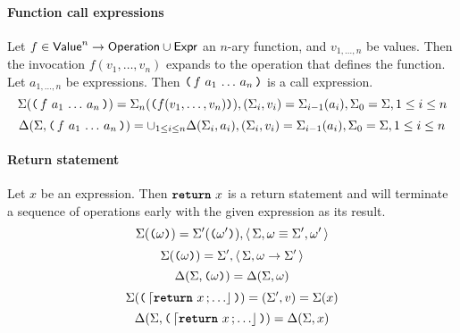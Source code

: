 \paragraph{Function call expressions}
Let $f \in \mathsf{Value}^n \to \mathsf{Operation} \cup \mathsf{Expr}$ an $n$-ary function, and $v_{1, \ldots, n}$ be values.
Then the invocation $f(v_1, \ldots, v_n)$ expands to the operation that defines the function.
Let $a_{1, \ldots, n}$ be expressions.
Then $\opexp{f}{a_1}{\ldots}{a_n}$ is a call expression.
$$
\Sigma(\opexp{f}{a_1}{\ldots}{a_n}) = \Sigma_n(\ttlparen f(v_1, \ldots, v_n) \ttrparen),
	(\Sigma_i, v_i) = \Sigma_{i-1}(a_i),
		\Sigma_0 = \Sigma, 1 \le i \le n
$$
$$
\Delta(\Sigma, \opexp{f}{a_1}{\ldots}{a_n}) =
		\cup_{1 \le i \le n} \Delta(\Sigma_i, a_i),
	(\Sigma_i, v_i) = \Sigma_{i-1}(a_i),
		\Sigma_0 = \Sigma, 1 \le i \le n
$$

\paragraph{Return statement}
Let $x$ be an expression.
Then $\texttt{\textbf{return}}~x$ is a return statement and will terminate a sequence of operations early with the given expression as its result.
$$
\Sigma(\texttt{(} \omega \texttt{)}) = \Sigma'(\texttt{(} \omega' \texttt{)}),
	\left\langle\, \Sigma, \omega \equiv \Sigma', \omega' \,\right\rangle
$$
$$
\Sigma(\texttt{(} \omega \texttt{)}) = \Sigma',
	\left\langle\, \Sigma, \omega \to \Sigma' \,\right\rangle
$$
$$
\Delta(\Sigma, \texttt{(} \omega \texttt{)}) = \Delta(\Sigma, \omega)
$$
$$
\Sigma(\ttlparen \stmt{\retstmt{x}}{\ldots} \ttrparen) = (\Sigma', v) = \Sigma(x)
$$
$$
\Delta(\Sigma, \ttlparen \stmt{\retstmt{x}}{\ldots} \ttrparen) = \Delta(\Sigma, x)
$$